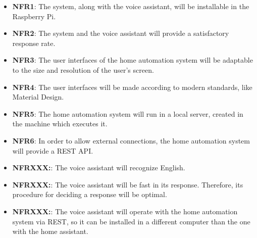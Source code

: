 \begin{itemize}
	\item \textbf{NFR1}: The system, along with the voice assistant, will be installable in the Raspberry Pi.
	\item \textbf{NFR2}: The system and the voice assistant will provide a satisfactory response rate.
	\item \textbf{NFR3}: The user interfaces of the home automation system will be adaptable to the size and resolution of the
	user's screen.
	\item \textbf{NFR4}: The user interfaces will be made according to modern standards, like Material Design.
	\item \textbf{NFR5}: The home automation system will run in a local server, created in the machine which executes it.
	\item \textbf{NFR6}: In order to allow external connections, the home automation system will provide a REST API.
	\item \textbf{NFRXXX:}: The voice assistant will recognize English.
	\item \textbf{NFRXXX:}: The voice assistant will be fast in its response. Therefore, its procedure for deciding a response will 
	be optimal.
	\item \textbf{NFRXXX:}: The voice assistant will operate with the home automation system via REST, so it can be installed in a
	different computer than the one with the home assistant.
\end{itemize}